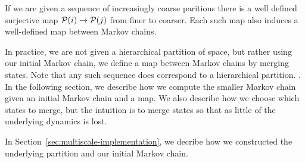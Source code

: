 If we are given a sequence of increasingly coarse paritions there is a well defined surjective map 
$\mathcal{P}(i)\rightarrow\mathcal{P}(j)$ from finer to coarser. Each such map also induces a well-defined map between Markov chains. 

In practice, we are not given a hierarchical partition of space, but rather using our initial Markov chain, we define a map between Markov chains by merging states. Note that any such sequence does correspond to a hierarchical partition. .  In the following section, we describe how we compute the smaller Markov chain given an initial Markov chain and a map. We also describe how we choose which states to merge, but the intuition is to merge states so that as little of the underlying dynamics is lost. 

In Section~\ref{sec:multiscale-implementation}, we decribe how we constructed the underlying partition and our initial Markov chain.  




